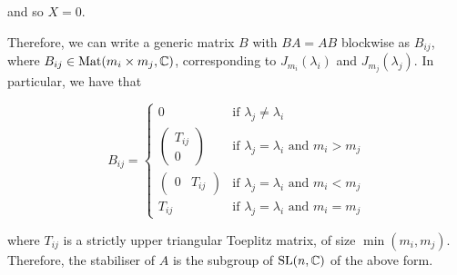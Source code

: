 \documentclass{article}
\begin{document}
and so \(X = 0\).

Therefore, we can write a generic matrix \(B\) with \(BA = AB\) blockwise as \(B_{ij}\), where \(B_{ij} \in \operatorname{Mat}(m_i \times m_j, \mathbb{C})\), corresponding to \(J_{m_i}(\lambda_i)\) and \(J_{m_j}(\lambda_j)\). In particular, we have that

\[B_{ij} = \begin{cases}
    0 & \text{if }\lambda_j \ne \lambda_i \\
    \begin{pmatrix}
        T_{ij} \\ 0
    \end{pmatrix} & \text{if } \lambda_j = \lambda_i \text{ and } m_i > m_j \\
    \begin{pmatrix}
        0 & T_{ij}
    \end{pmatrix} & \text{if } \lambda_j = \lambda_i \text{ and } m_i < m_j \\
    T_{ij} & \text{if } \lambda_j = \lambda_i \text{ and } m_i = m_j
\end{cases}\]

where \(T_{ij}\) is a strictly upper triangular Toeplitz matrix, of size \(\min(m_i, m_j)\). Therefore, the stabiliser of \(A\) is the subgroup of \(\operatorname{SL}(n, \mathbb{C})\) of the above form.
\end{document}
